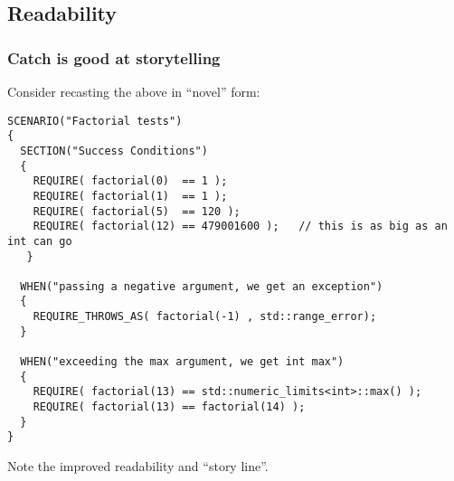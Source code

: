 \subsection{Readability}
\begin{frame}[fragile,t]
\frametitle{Catch is good at storytelling}
Consider recasting the above in ``novel'' form:
{\scriptsize\begin{verbatim}
SCENARIO("Factorial tests") 
{
  SECTION("Success Conditions") 
  {
    REQUIRE( factorial(0)  == 1 );
    REQUIRE( factorial(1)  == 1 );
    REQUIRE( factorial(5)  == 120 );
    REQUIRE( factorial(12) == 479001600 );   // this is as big as an int can go
   }

  WHEN("passing a negative argument, we get an exception") 
  {
    REQUIRE_THROWS_AS( factorial(-1) , std::range_error);
  }

  WHEN("exceeding the max argument, we get int max") 
  {
    REQUIRE( factorial(13) == std::numeric_limits<int>::max() );  
    REQUIRE( factorial(13) == factorial(14) );
  }
}
\end{verbatim}}

Note the improved readability and ``story line''.

\end{frame}

